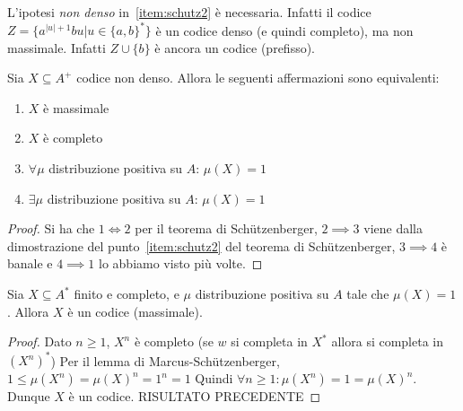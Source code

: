 \begin{note}
  L'ipotesi \emph{non denso} in~\ref{item:schutz2} è necessaria. Infatti il codice \(Z = \{a^{|u|+1}bu | u \in {\{a,b\}}^*\}\) è un codice denso (e quindi completo), ma non massimale.
  Infatti \(Z\cup\{b\}\) è ancora un codice (prefisso).
\end{note}

\begin{corollary}
  Sia \(X \subseteq A^+\) codice non denso. Allora le seguenti affermazioni sono equivalenti:
  \begin{enumerate}
    \item \(X\) è massimale
    \item \(X\) è completo
    \item \(\forall \mu\) distribuzione positiva su \(A\): \(\mu(X) = 1\)
    \item \(\exists \mu\) distribuzione positiva su \(A\): \(\mu(X) = 1\)
  \end{enumerate}
\end{corollary}
\begin{proof}
  Si ha che \(1 \iff 2\) per il teorema di Schützenberger, \(2 \implies 3\) viene dalla dimostrazione del punto~\ref{item:schutz2} del teorema di Schützenberger, \(3 \implies 4\) è banale e \(4 \implies 1\) lo abbiamo visto più volte.
\end{proof}

\begin{proposition}
  Sia \(X\subseteq A^*\) finito e completo, e \(\mu\) distribuzione positiva su \(A\) tale che \(\mu(X) = 1\). Allora \(X\) è un codice (massimale).
\end{proposition}

\begin{proof}
  Dato \(n \geq 1\), \(X^n\) è completo (se \(w\) si completa in \(X^*\) allora si completa in \({(X^n)}^*\))
  Per il lemma di Marcus-Schützenberger, 
  \(1\leq \mu(X^n) = {\mu(X)}^n = 1^n = 1\)
  Quindi \(\forall n \geq 1: \mu(X^n) = 1 = {\mu(X)}^n\). Dunque \(X\) è un codice. RISULTATO PRECEDENTE
\end{proof}

